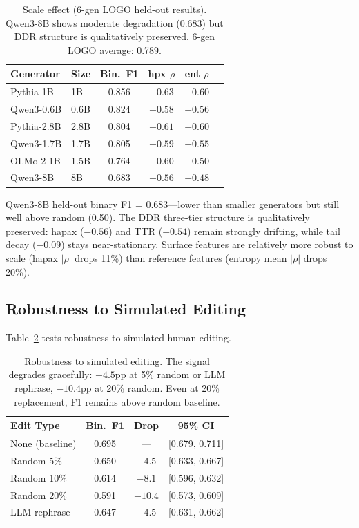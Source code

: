 \documentclass[11pt,a4paper]{article}
\begin{document}
\begin{table}[t]
\centering
\small
\begin{tabular}{llcccc}
\toprule
\textbf{Generator} & \textbf{Size} & \textbf{Bin.~F1} & \textbf{hpx $\rho$} & \textbf{ent $\rho$} \\
\midrule
Pythia-1B & 1B & 0.856 & $-0.63$ & $-0.60$ \\
Qwen3-0.6B & 0.6B & 0.824 & $-0.58$ & $-0.56$ \\
Pythia-2.8B & 2.8B & 0.804 & $-0.61$ & $-0.60$ \\
Qwen3-1.7B & 1.7B & 0.805 & $-0.59$ & $-0.55$ \\
OLMo-2-1B & 1.5B & 0.764 & $-0.60$ & $-0.50$ \\
Qwen3-8B & 8B & 0.683 & $-0.56$ & $-0.48$ \\
\bottomrule
\end{tabular}
\caption{Scale effect (6-gen LOGO held-out results). Qwen3-8B shows moderate degradation (0.683) but DDR structure is qualitatively preserved. 6-gen LOGO average: 0.789.}
\label{tab:scale}
\end{table}

Qwen3-8B held-out binary F1 = 0.683---lower than smaller generators but still well above random (0.50). The DDR three-tier structure is qualitatively preserved: hapax ($-0.56$) and TTR ($-0.54$) remain strongly drifting, while tail decay ($-0.09$) stays near-stationary. Surface features are relatively more robust to scale (hapax $|\rho|$ drops 11\%) than reference features (entropy mean $|\rho|$ drops 20\%).

\subsection{Robustness to Simulated Editing}
\label{sec:robustness}

Table~\ref{tab:editing} tests robustness to simulated human editing.

\begin{table}[t]
\centering
\small
\begin{tabular}{lccc}
\toprule
\textbf{Edit Type} & \textbf{Bin.~F1} & \textbf{Drop} & \textbf{95\% CI} \\
\midrule
None (baseline) & 0.695 & --- & [0.679, 0.711] \\
Random 5\% & 0.650 & $-4.5$ & [0.633, 0.667] \\
Random 10\% & 0.614 & $-8.1$ & [0.596, 0.632] \\
Random 20\% & 0.591 & $-10.4$ & [0.573, 0.609] \\
LLM rephrase & 0.647 & $-4.5$ & [0.631, 0.662] \\
\bottomrule
\end{tabular}
\caption{Robustness to simulated editing. The signal degrades gracefully: $-4.5$pp at 5\% random or LLM rephrase, $-10.4$pp at 20\% random. Even at 20\% replacement, F1 remains above random baseline.}
\label{tab:editing}
\end{table}
\end{document}
